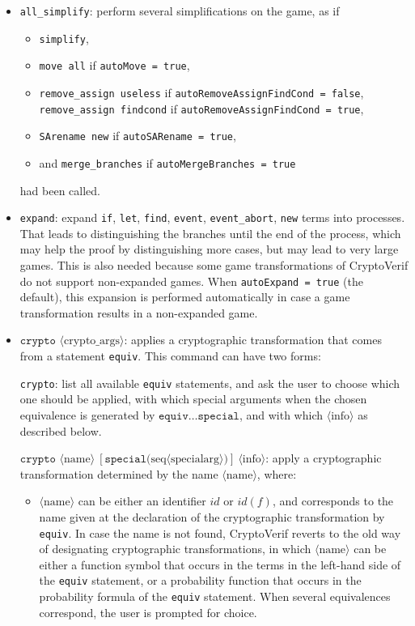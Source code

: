 \documentclass{article}
\newcommand{\nonterm}[1]{\langle\textrm{#1}\rangle}
\newcommand{\seq}[1]{\textrm{seq}\nonterm{#1}}
\begin{document}
\begin{itemize}
\item \texttt{all\string_simplify}: perform several simplifications 
on the game, as if 
\begin{itemize}
\item \texttt{simplify}, 
\item \texttt{move all} if \texttt{autoMove = true}, 
\item \texttt{remove\string_assign useless} if \texttt{autoRemoveAssignFindCond = false}, \\
  \texttt{remove\string_assign findcond} if \texttt{autoRemoveAssignFindCond = true},
\item \texttt{SArename new} if \texttt{autoSARename = true},
\item and \texttt{merge\string_branches} if \texttt{autoMergeBranches = true}
\end{itemize}
had been called.

\item \texttt{expand}: expand \texttt{if}, \texttt{let}, \texttt{find},
\texttt{event}, \texttt{event\_abort}, \texttt{new} terms into processes.
That leads to distinguishing the branches until the end of the process,
which may help the proof by distinguishing more cases, but
may lead to very large games.
This is also needed because some game transformations of CryptoVerif
do not support non-expanded games.
When \texttt{autoExpand = true} (the default), this expansion
is performed automatically in case a game transformation results
in a non-expanded game. 

\item $\texttt{crypto }\nonterm{crypto\_args}$: applies a cryptographic transformation
that comes from a statement \texttt{equiv}. This command can
have two forms:

\texttt{crypto}: list all available \texttt{equiv} statements,
and ask the user to choose which one should be applied, 
with which special arguments when the chosen equivalence is generated by 
$\texttt{equiv} \dots \texttt{special}$,
and with which $\nonterm{info}$ as described below.

$\texttt{crypto }\nonterm{name}\ [\texttt{special(}\seq{specialarg}\texttt{)}]\ \nonterm{info}$: 
apply a cryptographic transformation determined by the name $\nonterm{name}$, where: 
\begin{itemize}
\item $\nonterm{name}$ can be either an identifier $\mathit{id}$ or $\mathit{id}(f)$, 
and corresponds to the name given at the declaration of the 
cryptographic transformation by \texttt{equiv}.
In case the name is not found, CryptoVerif reverts to the
old way of designating cryptographic transformations, in which
$\nonterm{name}$ can be either a
function symbol that occurs in the terms in the left-hand side of the
\texttt{equiv} statement, or a probability function that occurs in the
probability formula of the \texttt{equiv} statement.
When several equivalences correspond, the user is prompted for choice.


\end{itemize}
\end{itemize}
\end{document}
